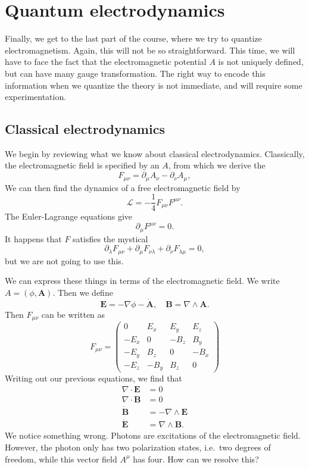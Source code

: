 \documentclass[a4paper]{article}
\begin{document}
\section{Quantum electrodynamics}
Finally, we get to the last part of the course, where we try to quantize electromagnetism. Again, this will not be so straightforward. This time, we will have to face the fact that the electromagnetic potential $A$ is not uniquely defined, but can have many gauge transformation. The right way to encode this information when we quantize the theory is not immediate, and will require some experimentation.

\subsection{Classical electrodynamics}
We begin by reviewing what we know about classical electrodynamics. Classically, the electromagnetic field is specified by an  $A$, from which we derive the 
\[
  F_{\mu\nu} = \partial_\mu A_\nu - \partial_\nu A_\mu,
\]
We can then find the dynamics of a free electromagnetic field by
\[
  \mathcal{L} = -\frac{1}{4} F_{\mu\nu}F^{\mu\nu}.
\]
The Euler-Lagrange equations give
\[
  \partial_\mu F^{\mu\nu} = 0.
\]
It happens that $F$ satisfies the mystical 
\[
  \partial_\lambda F_{\mu\nu} + \partial_\mu F_{\nu\lambda} + \partial_\nu F_{\lambda\mu} = 0,
\]
but we are not going to use this.

We can express these things in terms of the electromagnetic field. We write $A = (\phi, \mathbf{A})$. Then we define
\[
  \mathbf{E} = - \nabla \phi - \dot{\mathbf{A}},\quad \mathbf{B} = \nabla\wedge \mathbf{A}.
\]
Then $F_{\mu\nu}$ can be written as
\[
  F_{\mu\nu} =
  \begin{pmatrix}
    0 & E_x & E_y & E_z\\
    -E_x & 0 & -B_z & B_y\\
    -E_y & B_z & 0 & -B_x\\
    -E_z & -B_y & B_z & 0
  \end{pmatrix}
\]
Writing out our previous equations, we find that
\begin{align*}
  \nabla \cdot \mathbf{E} &= 0\\
  \nabla \cdot \mathbf{B} &= 0\\
  \dot{\mathbf{B}} &= - \nabla \wedge \mathbf{E}\\
  \dot{\mathbf{E}} &= \nabla \wedge \mathbf{B}.
\end{align*}
We notice something wrong. Photons are excitations of the electromagnetic field. However, the photon only has two polarization states, i.e.\ two degrees of freedom, while this vector field $A^\mu$ has four. How can we resolve this?
\end{document}
